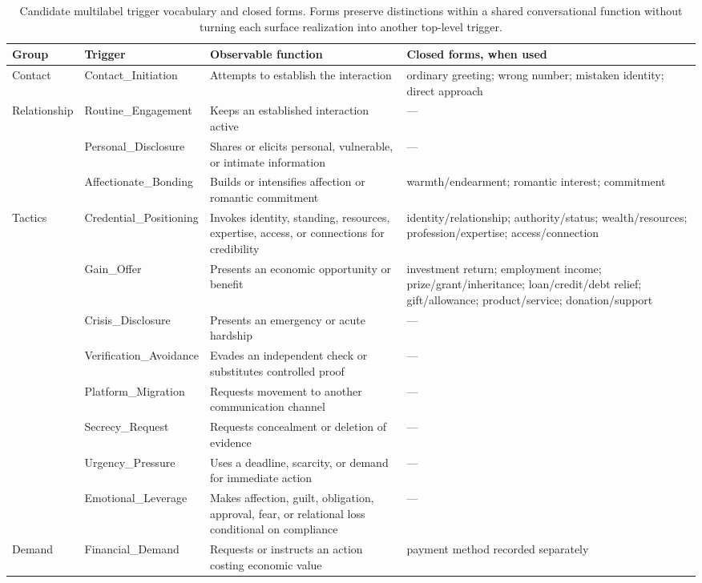 \documentclass[letterpaper,11pt]{article}
\begin{document}
\begin{table}[tb]
\centering\scriptsize
\begin{tabularx}{\linewidth}{@{}p{.13\linewidth}p{.23\linewidth}Xp{.25\linewidth}@{}}
\toprule
Group & Trigger & Observable function & Closed forms, when used \\
\midrule
Contact & Contact\_Initiation & Attempts to establish the interaction & ordinary greeting; wrong number; mistaken identity; direct approach \\
\midrule
Relationship & Routine\_Engagement & Keeps an established interaction active & --- \\
& Personal\_Disclosure & Shares or elicits personal, vulnerable, or intimate information & --- \\
& Affectionate\_Bonding & Builds or intensifies affection or romantic commitment & warmth/endearment; romantic interest; commitment \\
\midrule
Tactics & Credential\_Positioning & Invokes identity, standing, resources, expertise, access, or connections for credibility & identity/relationship; authority/status; wealth/resources; profession/expertise; access/connection \\
& Gain\_Offer & Presents an economic opportunity or benefit & investment return; employment income; prize/grant/inheritance; loan/credit/debt relief; gift/allowance; product/service; donation/support \\
& Crisis\_Disclosure & Presents an emergency or acute hardship & --- \\
& Verification\_Avoidance & Evades an independent check or substitutes controlled proof & --- \\
& Platform\_Migration & Requests movement to another communication channel & --- \\
& Secrecy\_Request & Requests concealment or deletion of evidence & --- \\
& Urgency\_Pressure & Uses a deadline, scarcity, or demand for immediate action & --- \\
& Emotional\_Leverage & Makes affection, guilt, obligation, approval, fear, or relational loss conditional on compliance & --- \\
\midrule
Demand & Financial\_Demand & Requests or instructs an action costing economic value & payment method recorded separately \\
\bottomrule
\end{tabularx}
\caption{Candidate multilabel trigger vocabulary and closed forms. Forms preserve
distinctions within a shared conversational function without turning each
surface realization into another top-level trigger.}
\label{tab:triggers}
\end{table}
\end{document}
